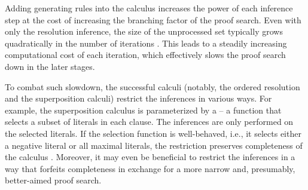 

Adding generating rules into the calculus increases the power of each inference step at the cost of increasing the branching factor of the proof search.
Even with only the resolution inference, the size of the unprocessed set typically grows quadratically in the number of iterations \cite{}.
This leads to a steadily increasing computational cost of each iteration,
which effectively slows the proof search down in the later stages.


To combat such slowdown, the successful calculi (notably, the ordered resolution and the superposition calculi) restrict the inferences in various ways.
For example, the superposition calculus is parameterized by a  -- a function that selects a subset of literals in each clause.
The inferences are only performed on the selected literals.
If the selection function is well-behaved,
i.e., it selects either a negative literal or all maximal literals,
the restriction preserves completeness of the calculus \cite{DBLP:journals/logcom/BachmairG94}.
Moreover, it may even be beneficial to restrict the inferences in a way that forfeits completeness
in exchange for a more narrow and, presumably, better-aimed proof search.

